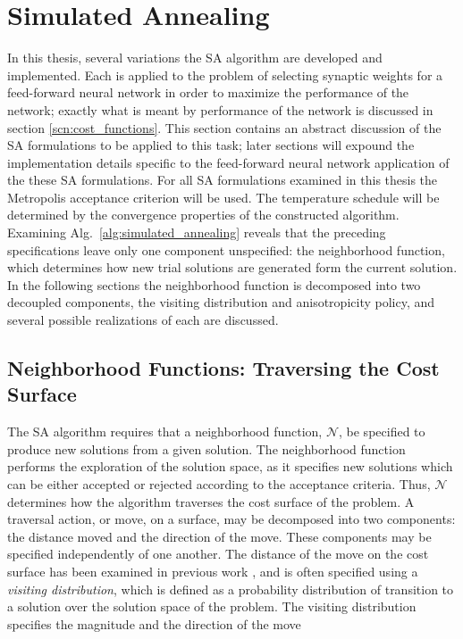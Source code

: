 \documentclass[11pt]{afthesis}
\begin{document}
	\section{Simulated Annealing}
	\label{scn:simulated_annealing}
	
	In this thesis, several variations the SA algorithm are developed and implemented. Each is applied to the problem of selecting synaptic weights for a feed-forward neural network in order to maximize the performance of the network; exactly what is meant by performance of the network is discussed in section \ref{scn:cost_functions}. This section contains an abstract discussion of the SA formulations to be applied to this task; later sections will expound the implementation details specific to the feed-forward neural network application of the these SA formulations. For all SA formulations examined in this thesis the Metropolis acceptance criterion will be used. The temperature schedule will be determined by the convergence properties of the constructed algorithm. Examining Alg.~\ref{alg:simulated_annealing} reveals that the preceding specifications leave only one component unspecified: the neighborhood function, which determines how new trial solutions are generated form the current solution. In the following sections the neighborhood function is decomposed into two decoupled components, the visiting distribution and anisotropicity policy, and several possible realizations of each are discussed.
	
	\subsection{Neighborhood Functions: Traversing the Cost Surface}
	
	The SA algorithm requires that a neighborhood function, \begin{math} \mathcal{N} \end{math}, be specified to produce new solutions from a given solution. The neighborhood function performs the exploration of the solution space, as it specifies new solutions which can be either accepted or rejected according to the acceptance criteria. Thus, \begin{math} \mathcal{N} \end{math} determines how the algorithm traverses the cost surface of the problem. A traversal action, or move, on a surface, may be decomposed into two components: the distance moved and the direction of the move. These components may be specified independently of one another. The distance of the move on the cost surface has been examined in previous work \cite{szu1987fastsimulatedannealing,tsallis1996generalizedsimulatedannealing,ingber1989veryfastsimulatedreannealing}, and is often specified using a \textit{visiting distribution}, which is defined as a probability distribution of transition to a solution over the solution space of the problem. The visiting distribution specifies the magnitude and the direction of the move
	
\end{document}
